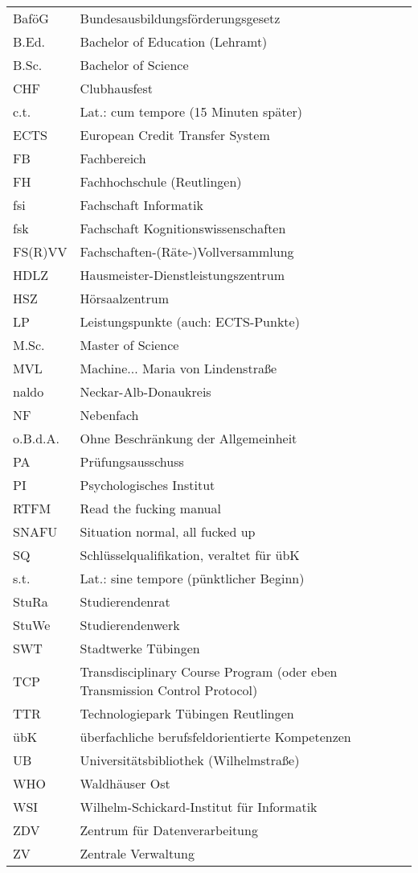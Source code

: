\renewcommand{\arraystretch}{1.2}
\begin{tabular}{ll}
BaföG    & Bundesausbildungsförderungsgesetz \\
B.Ed.    & Bachelor of Education (Lehramt) \\
B.Sc.    & Bachelor of Science \\
CHF      & Clubhausfest \\
c.t.     & Lat.: cum tempore (15 Minuten später) \\
ECTS     & European Credit Transfer System \\
FB       & Fachbereich \\
FH       & Fachhochschule (Reutlingen) \\
fsi      & Fachschaft Informatik \\
fsk      & Fachschaft Kognitionswissenschaften \\
FS(R)VV  & Fachschaften-(Räte-)Vollversammlung \\
HDLZ     & Hausmeister-Dienstleistungszentrum \\
HSZ      & Hörsaalzentrum \\
LP       & Leistungspunkte (auch: ECTS-Punkte) \\
M.Sc.    & Master of Science \\
MVL      & Machine... Maria von Lindenstraße \\
naldo    & Neckar-Alb-Donaukreis\\
NF       & Nebenfach \\
o.B.d.A. & Ohne Beschränkung der Allgemeinheit \\
PA       & Prüfungsausschuss \\
PI       & Psychologisches Institut \\
RTFM     & Read the fucking manual \\
SNAFU    & Situation normal, all fucked up \\
SQ       & Schlüsselqualifikation, veraltet für übK\\
s.t.     & Lat.: sine tempore (pünktlicher Beginn) \\
StuRa    & Studierendenrat \\
StuWe    & Studierendenwerk \\
SWT      & Stadtwerke Tübingen \\
TCP      & Transdisciplinary Course Program (oder eben Transmission Control Protocol) \\
TTR      & Technologiepark Tübingen Reutlingen \\
übK      & überfachliche berufsfeldorientierte Kompetenzen \\
UB       & Universitätsbibliothek (Wilhelmstraße) \\
WHO      & Waldhäuser Ost \\
WSI      & Wilhelm-Schickard-Institut für Informatik \\
ZDV      & Zentrum für Datenverarbeitung \\
ZV       & Zentrale Verwaltung\\
\end{tabular}
\vfill %
